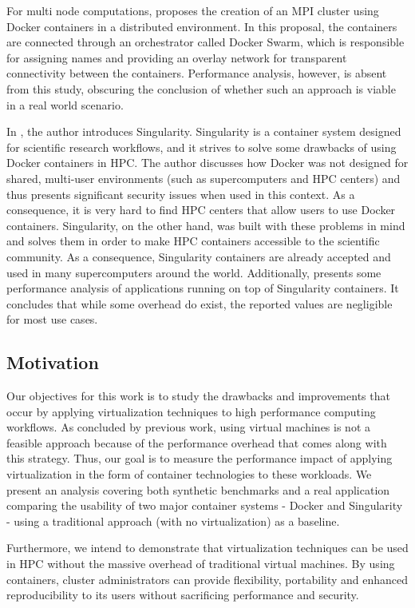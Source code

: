 \documentclass[12pt]{article}
\begin{document}
For multi node computations, \cite{7868429} proposes the creation of an MPI cluster using Docker containers in a distributed environment. In this proposal, the containers are connected through an orchestrator called Docker Swarm, which is responsible for assigning names and providing an overlay network  for transparent connectivity between the containers. Performance analysis, however, is absent from this study, obscuring the conclusion of whether such an approach is viable in a real world scenario.

In \cite{10.1371/journal.pone.0177459}, the author introduces Singularity. Singularity is a container system designed for scientific research workflows, and it strives to solve some drawbacks of using Docker containers in HPC. The author discusses how Docker was not designed for shared, multi-user environments (such as supercomputers and HPC centers) and thus presents significant security issues when used in this context. As a consequence, it is very hard to find HPC centers that allow users to use Docker containers. Singularity, on the other hand, was built with these problems in mind and solves them in order to make HPC containers accessible to the scientific community. As a consequence, Singularity containers are already accepted and used in many supercomputers around the world. Additionally, \cite{Le:2017:PAA:3093338.3106737} presents some performance analysis of applications running on top of Singularity containers. It concludes that while some overhead do exist, the reported values are negligible for most use cases.

\subsection{Motivation}
Our objectives for this work is to study the drawbacks and improvements that occur by applying virtualization techniques to high performance computing workflows. As concluded by previous work, using virtual machines is not a feasible approach because of the performance overhead that comes along with this strategy. Thus, our goal is to measure the performance impact of applying virtualization in the form of container technologies to these workloads. We present an analysis covering both synthetic benchmarks and a real application comparing the usability of two major container systems - Docker and Singularity - using a traditional approach (with no virtualization) as a baseline.

Furthermore, we intend to demonstrate that virtualization techniques can be used in HPC without the massive overhead of traditional virtual machines. By using containers, cluster administrators can provide flexibility, portability and enhanced reproducibility to its users without sacrificing performance and security.
\end{document}
